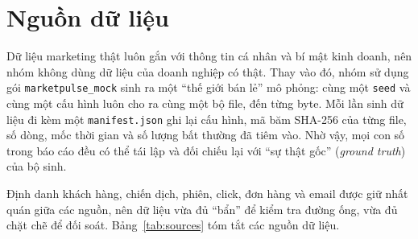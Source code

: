 
\section{Nguồn dữ liệu}
\label{sec:c2-nguon-du-lieu}

Dữ liệu marketing thật luôn gắn với thông tin cá nhân và bí mật kinh doanh, nên nhóm không dùng dữ liệu của doanh nghiệp có thật. Thay vào đó, nhóm sử dụng gói \texttt{marketpulse\_mock} sinh ra một ``thế giới bán lẻ'' mô phỏng: cùng một \texttt{seed} và cùng một cấu hình luôn cho ra cùng một bộ file, đến từng byte. Mỗi lần sinh dữ liệu đi kèm một \texttt{manifest.json} ghi lại cấu hình, mã băm SHA-256 của từng file, số dòng, mốc thời gian và số lượng bất thường đã tiêm vào. Nhờ vậy, mọi con số trong báo cáo đều có thể tái lập và đối chiếu lại với ``sự thật gốc'' (\emph{ground truth}) của bộ sinh.

Định danh khách hàng, chiến dịch, phiên, click, đơn hàng và email được giữ nhất quán giữa các nguồn, nên dữ liệu vừa đủ ``bẩn'' để kiểm tra đường ống, vừa đủ chặt chẽ để đối soát. Bảng~\ref{tab:sources} tóm tắt các nguồn dữ liệu.

